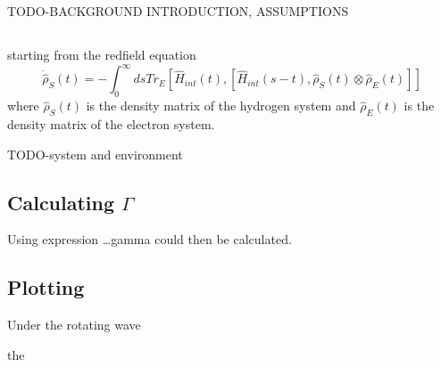 
\subsection{}
TODO-BACKGROUND INTRODUCTION, ASSUMPTIONS

\subsection{}
starting from the redfield equation
\begin{equation}
  \dot{\hat{\rho}}_S(t) =
  - \int_0^{\infty} ds
  Tr_{E}[\hat{H}_{int}(t),
      [\hat{H}_{int}(s-t),
          \hat{\rho}_S(t) \otimes \hat{\rho}_E(t)]]
\end{equation}
where \(\hat{\rho}_S(t)\) is the
density matrix of the hydrogen system
and \(\hat{\rho}_E(t)\) is the density
matrix of the electron system.

TODO-system and environment

\subsection{Calculating \(\Gamma \)}
Using expression \ldots gamma could then
be calculated.

\subsection{Plotting }
Under the rotating wave

the

